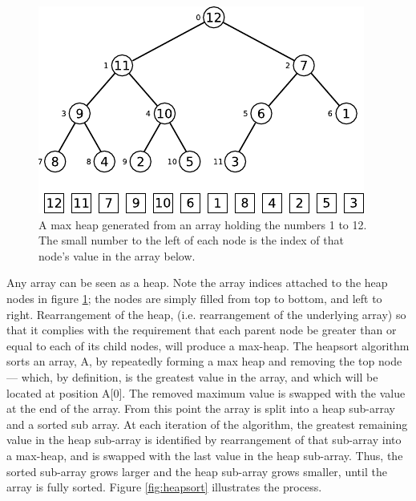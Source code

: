 \documentclass[12pt, a4paper]{article}
\begin{document}
\begin{figure}
    \centering
    \includegraphics{heap.pdf}
    \caption{\label{fig:heap}A max heap generated from an array holding the numbers 1 to 12. The small number to the left of each node is the index of that node's value in the array below.}
\end{figure}

Any array can be seen as a heap. Note the array indices attached to the heap nodes in figure \ref{fig:heap}; the nodes are simply filled from top to bottom, and left to right. Rearrangement of the heap, (i.e. rearrangement of the underlying array) so that it complies with the requirement that each parent node be greater than or equal to each of its child nodes, will produce a max-heap. The heapsort algorithm sorts an array, A, by repeatedly forming a max heap and removing the top node — which, by definition, is the greatest value in the array, and which will be located at position A[0]. The removed maximum value is swapped with the value at the end of the array. From this point the array is split into a heap sub-array and a sorted sub array. At each iteration of the algorithm, the greatest remaining value in the heap sub-array is identified by rearrangement of that sub-array into a max-heap, and is swapped with the last value in the heap sub-array. Thus, the sorted sub-array grows larger and the heap sub-array grows smaller, until the array is fully sorted. Figure \ref{fig:heapsort} illustrates the process.
\end{document}
